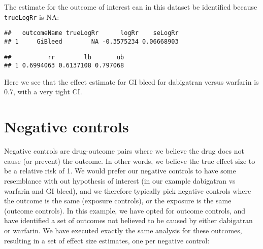 \documentclass[
]{article}
\newenvironment{Shaded}{\begin{snugshade}}{\end{snugshade}}
\newcommand{\KeywordTok}[1]{\textcolor[rgb]{0.13,0.29,0.53}{\textbf{#1}}}
\newcommand{\NormalTok}[1]{#1}
\newcommand{\OperatorTok}[1]{\textcolor[rgb]{0.81,0.36,0.00}{\textbf{#1}}}
\newcommand{\StringTok}[1]{\textcolor[rgb]{0.31,0.60,0.02}{#1}}
\begin{document}
The estimate for the outcome of interest can in this dataset be
identified because \texttt{trueLogRr} is NA:

\begin{Shaded}
\end{Shaded}

\begin{verbatim}
##   outcomeName trueLogRr      logRr    seLogRr
## 1     GiBleed        NA -0.3575234 0.06668903
\end{verbatim}

\begin{Shaded}
\end{Shaded}

\begin{verbatim}
##          rr        lb       ub
## 1 0.6994063 0.6137108 0.797068
\end{verbatim}

Here we see that the effect estimate for GI bleed for dabigatran versus
warfarin is 0.7, with a very tight CI.

\hypertarget{negative-controls}{%
\section{Negative controls}\label{negative-controls}}

Negative controls are drug-outcome pairs where we believe the drug does
not cause (or prevent) the outcome. In other words, we believe the true
effect size to be a relative risk of 1. We would prefer our negative
controls to have some resemblance with out hypothesis of interest (in
our example dabigatran vs warfarin and GI bleed), and we therefore
typically pick negative controls where the outcome is the same (exposure
controls), or the exposure is the same (outcome controls). In this
example, we have opted for outcome controls, and have identified a set
of outcomes not believed to be caused by either dabigatran or warfarin.
We have executed exactly the same analysis for these outcomes, resulting
in a set of effect size estimates, one per negative control:
\end{document}
